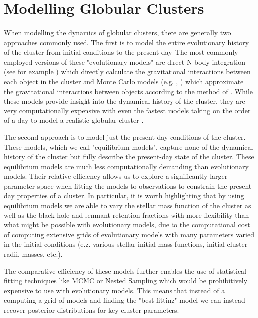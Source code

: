 \section{Modelling Globular Clusters}

\paragraph{}


When modelling the dynamics of globular clusters, there are generally two approaches commonly used.
The first is to model the entire evolutionary history of the cluster from initial conditions to the
present day. The most commonly employed versions of these "evolutionary models" are direct N-body
integration (see for example \citealt{Baumgardt2017a}) which directly calculate the gravitational
interactions between each object in the cluster and Monte Carlo models (e.g.
\citealt{Rodriguez2021}, \citealt{Hypki2013}) which approximate the gravitational interactions
between objects according to the method of \citet{Henon1971}. While these models provide insight
into the dynamical history of the cluster, they are very computationally expensive with even the
fastest models taking on the order of a day to model a realistic globular cluster
\citep{Rodriguez2021}.

The second approach is to model just the present-day conditions of the cluster. These models, which
we call "equilibrium models", capture none of the dynamical history of the cluster but fully
describe the present-day state of the cluster. These equilibrium models are much less
computationally demanding than evolutionary models. Their relative efficiency allows us to explore a
significantly larger parameter space when fitting the models to observations to constrain the
present-day properties of a cluster. In particular, it is worth highlighting that by using
equilibrium models we are able to vary the stellar mass function of the cluster as well as the black
hole and remnant retention fractions with more flexibility than what might be possible with
evolutionary models, due to the computational cost of computing extensive grids of evolutionary
models with many parameters varied in the initial conditions (e.g. various stellar initial mass
functions, initial cluster radii, masses, etc.).

The comparative efficiency of these models further enables the use of statistical fitting techniques
like MCMC or Nested Sampling which would be prohibitively expensive to use with evolutionary models.
This means that instead of a computing a grid of models and finding the "best-fitting" model we can
instead recover posterior distributions for key cluster parameters.


